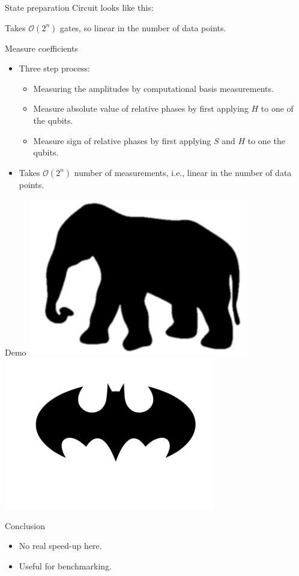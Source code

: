 \begin{frame}{State preparation}
	Circuit looks like this:
	\begin{center}
		
	\end{center}
	Takes $\mathcal{O}(2^n)$ gates, so linear in the number of data points.
\end{frame}

\begin{frame}{Measure coefficients}
	\pause
	\begin{itemize}
		\item Three step process:
		\begin{itemize}
			\item Measuring the amplitudes by computational basis measurements.
			\item Measure absolute value of relative phases by first applying $H$ to one of the qubits.
			\item Measure sign of relative phases by first applying $S$ and $H$ to one the qubits.
		\end{itemize} \pause
		\item Takes $\mathcal{O}(2^n)$ number of measurements, i.e., linear in the number of data points.
	\end{itemize}
\end{frame}

\begin{frame}{Demo}
	\includegraphics[width=.45\textwidth]{elephant.png} \hfill
	\includegraphics[width=.45\textwidth]{batman.png}
\end{frame}

\begin{frame}{Conclusion}
	\pause
	\begin{itemize}
		\item No real speed-up here. \pause
		\item Useful for benchmarking.
	\end{itemize}
\end{frame}